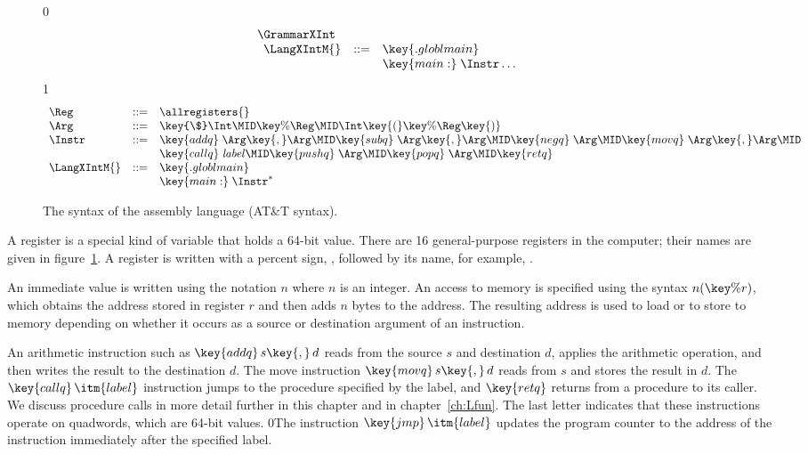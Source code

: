 \documentclass[7x10]{TimesAPriori_MIT}%
\def\racketEd{0}
\def\pythonEd{1}
\def\edition{1}
\newcommand{\racket}[1]{{\if\edition\racketEd{#1}\fi}}
\newcommand{\pythonColor}[0]{}
\numberwithin{theorem}{chapter}
\numberwithin{definition}{chapter}
\numberwithin{equation}{chapter}
\begin{document}
\begin{figure}[tp]
\begin{tcolorbox}[colback=white]
{\if\edition\racketEd    
\[
\begin{array}{l}
  \GrammarXInt \\
\begin{array}{lcl}
\LangXIntM{} &::= & \key{.globl main}\\
      &    & \key{main:} \; \Instr\ldots
\end{array}
\end{array}
\]
\fi}
{\if\edition\pythonEd\pythonColor
\[
\begin{array}{lcl}
\Reg &::=& \allregisters{} \\
\Arg &::=&  \key{\$}\Int \MID \key{\%}\Reg \MID \Int\key{(}\key{\%}\Reg\key{)}\\
\Instr &::=& \key{addq} \; \Arg\key{,} \Arg \MID
      \key{subq} \; \Arg\key{,} \Arg \MID
      \key{negq} \; \Arg \MID \key{movq} \; \Arg\key{,} \Arg \MID \\
  &&  \key{callq} \; \mathit{label} \MID
      \key{pushq}\;\Arg \MID \key{popq}\;\Arg \MID \key{retq} \\
\LangXIntM{} &::= & \key{.globl main}\\
      &    & \key{main:} \; \Instr^{*}
\end{array}
\]
\fi}
\end{tcolorbox}
\caption{The syntax of the \LangXInt{} assembly language (AT\&T syntax).}
\label{fig:x86-int-concrete}
\end{figure}

A register is a special kind of variable that holds a 64-bit
value. There are 16 general-purpose registers in the computer; their
names are given in figure~\ref{fig:x86-int-concrete}.  A register is
written with a percent sign, \key{\%}, followed by its name,
for example, .

An immediate value is written using the notation \key{\$}$n$ where $n$
is an integer.
%
%
An access to memory is specified using the syntax $n(\key{\%}r)$,
which obtains the address stored in register $r$ and then adds $n$
bytes to the address. The resulting address is used to load or to store
to memory depending on whether it occurs as a source or destination
argument of an instruction.

An arithmetic instruction such as $\key{addq}\,s\key{,}\,d$ reads from
the source $s$ and destination $d$, applies the arithmetic operation,
and then writes the result to the destination $d$. 
%
The move instruction $\key{movq}\,s\key{,}\,d$ reads from $s$ and
stores the result in $d$.
%
The $\key{callq}\,\itm{label}$ instruction jumps to the procedure
specified by the label, and $\key{retq}$ returns from a procedure to
its caller. 
%
We discuss procedure calls in more detail further in this chapter and
in chapter~\ref{ch:Lfun}.
%
The last letter  indicates that these instructions operate on
quadwords, which are 64-bit values.
%
\racket{The instruction $\key{jmp}\,\itm{label}$ updates the program
  counter to the address of the instruction immediately after the
  specified label.}
\end{document}
